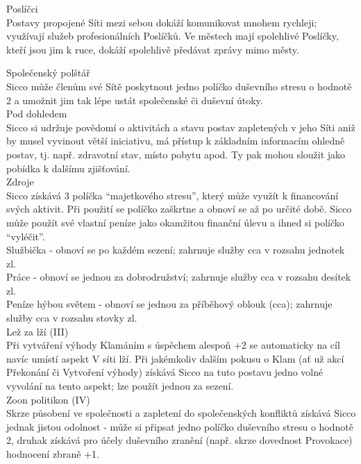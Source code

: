 \documentclass[../../main.tex]{subfiles}
\begin{document}
Poslíčci\\
Postavy propojené Síti mezi sebou dokáží komunikovat mnohem rychleji; využívají služeb profesionálních Poslíčků. Ve městech mají spolehlivé Poslíčky, kteří jsou jim k ruce, dokáží spolehlivě předávat zprávy mimo městy.

Společenský polštář\\
Sicco může členům své Sítě poskytnout jedno políčko duševního stresu o hodnotě 2 a umožnit jim tak lépe ustát společenské či duševní útoky.\\

Pod dohledem\\
Sicco si udržuje povědomí o aktivitách a stavu postav zapletených v jeho Síti
aniž by musel vyvinout větší iniciativu, má přístup k základním informacím ohledně postav, tj. např. zdravotní stav, místo pobytu apod. Ty pak mohou sloužit jako pobídka k dalšímu zjišťování.\\

Zdroje\\
Sicco získává 3 políčka “majetkového stresu”, který může využít k financování svých aktivit. Při použití se políčko zaškrtne a obnoví se až po určité době. Sicco může použít své vlastní peníze jako okamžitou finanční úlevu a ihned si políčko “vyléčit”.\\

Službička - obnoví se po každém sezení; zahrnuje služby cca v rozsahu jednotek zl.\\
Práce - obnoví se jednou za dobrodružství; zahrnuje služby cca v rozsahu desítek zl.\\
Peníze hýbou světem - obnoví se jednou za příběhový oblouk (cca); zahrnuje služby cca v rozsahu stovky zl.\\


Lež za lží (III)\\
Při vytváření výhody Klamáním s úspěchem alespoň +2 se automaticky na cíl navíc umístí aspekt V síti lží. Při jakémkoliv dalším pokusu o Klam (ať už akcí Překonání či Vytvoření výhody) získává Sicco na tuto postavu jedno volné vyvolání na tento aspekt; lze použít jednou za sezení. \\

Zoon politikon (IV)\\
Skrze působení ve společnosti a zapletení do společenských konfliktů získává Sicco jednak jistou odolnost - může si připsat jedno políčko duševního stresu o hodnotě 2, druhak získává pro účely duševního zranění (např. skrze dovednost Provokace) hodnocení zbraně +1.\\
\end{document}
